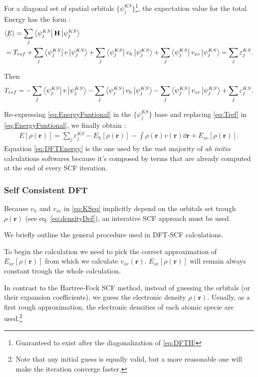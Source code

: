 \documentclass[a4paper,12pt]{article}
\newcommand\dens{\rho(\mathbf{r})}
\newcommand\erre{\mathbf{r}}
\begin{document}
For a diagonal set of spatial orbitals $\{\psi^{KS}_{j}\}$\footnote{Guaranteed to exist after the diagonalization of \eqref{eq:DFTH}}, the expectation value for the total Energy has the form :
\begin{align}
	& \langle E \rangle = \sum_{j} \bra{\psi^{KS}_{j}}\mathbf{H}\ket{\psi^{KS}_{j}} \\
	&= T_{ref} + \sum_{j} \bra{\psi^{KS}_{j}}v\ket{\psi^{KS}_{j}} + \sum_{j} \bra{\psi^{KS}_{j}}v_{h}\ket{\psi^{KS}_{j}} + \sum_{j} \bra{\psi^{KS}_{j}}v_{xc}\ket{\psi^{KS}_{j}} = 
	\sum_{j} \varepsilon^{KS}_{j} .
\end{align}

Then 
\begin{equation}\label{eq:Tref}
T_{ref} = - \sum_{j} \bra{\psi^{KS}_{j}}v\ket{\psi^{KS}_{j}} - \sum_{j} \bra{\psi^{KS}_{j}}v_{h}\ket{\psi^{KS}_{j}} - \sum_{j} \bra{\psi^{KS}_{j}}v_{xc}\ket{\psi^{KS}_{j}} + \sum_{j} \varepsilon^{KS}_{j} .
\end{equation}

Re-expressing \eqref{eq:EnergyFuntional} in the $\{\psi^{KS}_{j}\}$ base and replacing \eqref{eq:Tref} in \eqref{eq:EnergyFuntional}, we finally obtain :
\begin{align}\label{eq:DFTEnergy}
	E[\dens] = \sum_{j}\varepsilon^{KS}_{j} - E_{h}[\dens] - \int \dens v(\erre) \dd{\erre}+ E_{xc}[\dens].
\end{align}
Equation \eqref{eq:DFTEnergy} is the one used by the vast majority of \textit{ab initio} calculations softwares because it's composed by terms that are already computed at the end of every SCF iteration.





\subsubsection{Self Consistent DFT}\label{sec:SCF-DFT}
Because $v_{h}$ and $v_{xc}$ in \eqref{eq:KSeq} implicitly depend on the orbitals set trough $\dens$ (see eq. \eqref{eq:densityDef}), an interative SCF approach must be used. 

We briefly outline the general procedure used in DFT-SCF calculations.

To begin the calculation we need to pick the correct approximation of $E_{xc}[\dens]$ from which we calculate $v_{xc}(\erre)$. $E_{xc}[\dens]$ will remain always constant trough the whole calculation.

In contrast to the Hartree-Fock SCF method, instead of guessing the orbitals (or their expansion coefficients), we guess the electronic density $\dens$. 
Usually, as a first rough approximation, the electronic densities of each atomic specie are used.\footnote{Note that any initial guess is equally valid, but a more reasonable one will make the iteration converge faster.}
\end{document}
